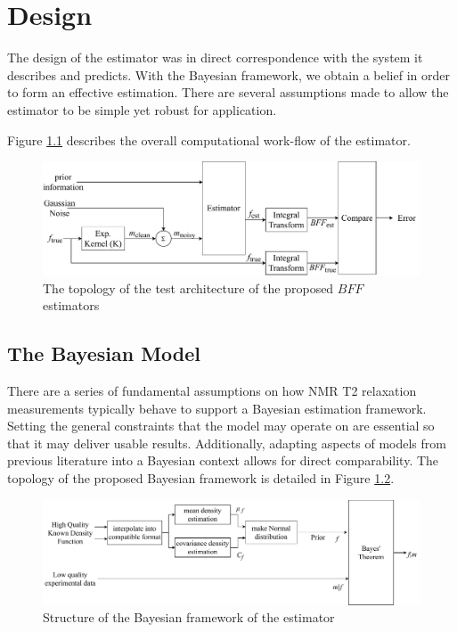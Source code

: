 \chapter{Design}\label{C:design}

The design of the estimator was in direct correspondence with the system it describes and predicts. With the Bayesian framework, we obtain a belief in order to form an effective estimation. There are several assumptions made to allow the estimator to be simple yet robust for application.


Figure \ref{fig:test_topology} describes the overall computational work-flow of the estimator.


\begin{figure}[h]
    \centering
    \includegraphics[width=\textwidth]{design/SystemWorkflow489.pdf}
    \caption{The topology of the test architecture of the proposed $BFF$ estimators}
    \label{fig:test_topology}
\end{figure}

\section{The Bayesian Model} \label{section:bayesTechniqueDesign}
There are a series of fundamental assumptions on how NMR T2 relaxation measurements typically behave to support a Bayesian estimation framework. Setting the general constraints that the model may operate on are essential so that it may deliver usable results. Additionally, adapting aspects of models from previous literature into a Bayesian context allows for direct comparability. The topology of the proposed Bayesian framework is detailed in Figure \ref{fig:bayesian_framework}.


\begin{figure}[h]
    \centering
    \includegraphics[width=\textwidth]{design/BayesianTechniqueTopology.pdf}
    \caption{Structure of the Bayesian framework of the estimator}
    \label{fig:bayesian_framework}
\end{figure}



